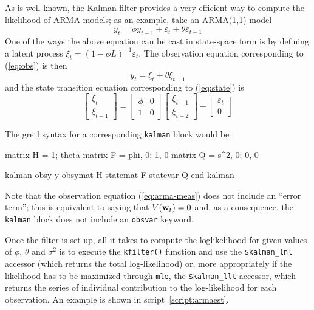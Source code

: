 As is well known, the Kalman filter provides a very efficient way to
compute the likelihood of ARMA models; as an example, take an
ARMA(1,1) model
\[
  y_t = \phi y_{t-1} + \varepsilon_t + \theta \varepsilon_{t-1}
\]
One of the ways the above equation can be cast in state-space form is
by defining a latent process $\xi_t = (1 - \phi L)^{-1}
\varepsilon_t$.   The observation equation corresponding to (\ref{eq:obs})
is then
%
\begin{equation}
y_t = \xi_t + \theta \xi_{t-1} \label{eq:arma-meas}
\end{equation}
%
and the state transition equation corresponding to (\ref{eq:state}) is
%
\[
  \left[ \begin{array}{c} \xi_t \\ \xi_{t-1} \end{array} \right] =
  \left[ \begin{array}{cc} \phi & 0 \\ 1 & 0 \end{array} \right]
  \left[ \begin{array}{c} \xi_{t-1} \\ \xi_{t-2} \end{array} \right] +
  \left[ \begin{array}{c} \varepsilon_t \\ 0 \end{array} \right] 
\]

The gretl syntax for a corresponding \texttt{kalman} block would be
\begin{code}
matrix H = {1; theta}
matrix F = {phi, 0; 1, 0}
matrix Q = {s^2, 0; 0, 0}

kalman
    obsy y
    obsymat H
    statemat F
    statevar Q
end kalman
\end{code}
Note that the observation equation (\ref{eq:arma-meas}) does not
include an ``error term''; this is equivalent to saying that
$V(\mathbf{w}_t) = 0$ and, as a consequence, the \texttt{kalman} block
does not include an \texttt{obsvar} keyword.

Once the filter is set up, all it takes to compute the loglikelihood
for given values of $\phi$, $\theta$ and $\sigma^2$ is to execute the
\texttt{kfilter()} function and use the \verb+$kalman_lnl+ accessor
(which returns the total log-likelihood) or, more appropriately if the
likelihood has to be maximized through \texttt{mle}, the
\verb+$kalman_llt+ accessor, which returns the series of individual
contribution to the log-likelihood for each observation. An example
is shown in script~\ref{script:armaest}.

